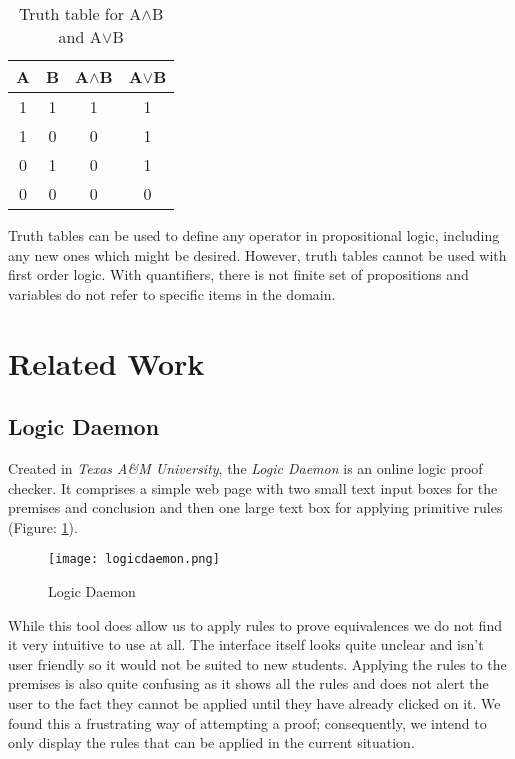 \documentclass[draft]{report}
\begin{document}
\vspace{5 mm}
\begin{table}[ht]
\begin{center}
  \begin{tabular}{ | c | c || c | c | }
    \hline
    A & B & A$\land$B & A$\lor$B \\ \hline
    1 & 1 & 1 & 1 \\
    1 & 0 & 0 & 1\\
    0 & 1 & 0 & 1 \\
    0 & 0 & 0 & 0 \\
    \hline
  \end{tabular}
\caption{Truth table for A$\land$B and A$\lor$B}
\label{table:a_and_b_truth_table}
\end{center}
\end{table}
\vspace{5 mm}

Truth tables can be used to define any operator in propositional logic, including any new ones which might be desired. However, truth tables cannot be used with first order logic. With quantifiers, there is not finite set of propositions and variables do not refer to specific items in the domain.

\section{Related Work}
\label{sec:related_work}

\subsection{Logic Daemon}

Created in \emph{Texas A\&M University}, the \emph{Logic Daemon}\cite{logicdaemon} is an online logic proof checker. It comprises a simple web page with two small text input boxes for the premises and conclusion and then one large text box for applying primitive rules (Figure: \ref{logicdaemon}).

\begin{figure}[ht]
    \centering
    \texttt{[image: logicdaemon.png]}
    \caption{Logic Daemon}
    \label{logicdaemon}
\end{figure}

While this tool does allow us to apply rules to prove equivalences we do not find it very intuitive to use at all. The interface itself looks quite unclear and isn't user friendly so it would not be suited to new students. Applying the rules to the premises is also quite confusing as it shows all the rules and does not alert the user to the fact they cannot be applied until they have already clicked on it. We found this a frustrating way of attempting a proof; consequently, we intend to only display the rules that can be applied in the current situation.
\end{document}
